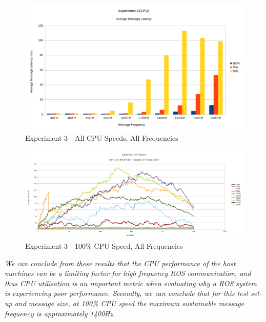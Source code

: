 \documentclass[../dissertation.tex]{subfiles}
\begin{document}
\begin{figure}[H]
\centering
\includegraphics[width=\textwidth]{images/experiment3/average_per_frequency_graph.png}
\caption{Experiment 3 - All CPU Speeds, All Frequencies}
\label{exp3-averages}
\end{figure}

\begin{figure}[H]
\centering
\includegraphics[width=\textwidth]{images/experiment3/50_clockspeed_mean_values_by_freq_pretty.png}
\caption{Experiment 3 - 100\% CPU Speed, All Frequencies}
\label{exp3-cpu100}
\end{figure}

\textit{We can conclude from these results that the CPU performance of the host machines can be a limiting factor for high frequency ROS communication, and thus CPU utilisation is an important metric when evaluating why a ROS system is experiencing poor performance. Secondly, we can conclude that for this test set-up and message size, at 100\% CPU speed the maximum sustainable message frequency is approximately 1400Hz.}
\end{document}
